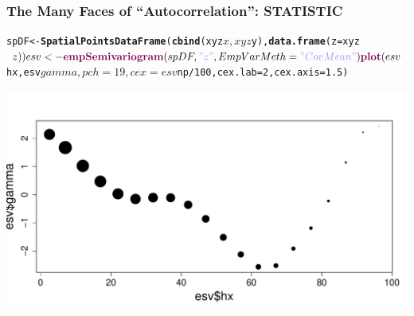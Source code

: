 \documentclass[mathserif,compress]{beamer}\usepackage{graphicx, color}
\makeatletter
\newcommand{\hlfunctioncall}[1]{\textcolor[rgb]{0.501960784313725,0,0.329411764705882}{\textbf{#1}}}%
\newcommand{\hlstring}[1]{\textcolor[rgb]{0.6,0.6,1}{#1}}%
\newenvironment{kframe}{%
 \def\at@end@of@kframe{}%
 \ifinner\ifhmode%
  \def\at@end@of@kframe{\end{minipage}}%
  \begin{minipage}{\columnwidth}%
 \fi\fi%
 \def\FrameCommand##1{\hskip\@totalleftmargin \hskip-\fboxsep
 \colorbox{shadecolor}{##1}\hskip-\fboxsep
     \hskip-\linewidth \hskip-\@totalleftmargin \hskip\columnwidth}%
 \MakeFramed {\advance\hsize-\width
   \@totalleftmargin\z@ \linewidth\hsize
   \@setminipage}}%
 {\par\unskip\endMakeFramed%
 \at@end@of@kframe}
\newenvironment{knitrout}{}{} %
\makeatother
\begin{document}
\begin{frame} [fragile]
\frametitle{The Many Faces of ``Autocorrelation'': STATISTIC}
     
\begin{knitrout}\tiny
{}\color{fgcolor}\begin{kframe}
\begin{alltt}
spDF <- \hlfunctioncall{SpatialPointsDataFrame}(\hlfunctioncall{cbind}(xyz$x, xyz$y), \hlfunctioncall{data.frame}(z = xyz$z))
esv <- \hlfunctioncall{empSemivariogram}(spDF, \hlstring{"z"}, EmpVarMeth = \hlstring{"CovMean"})
\hlfunctioncall{plot}(esv$hx, esv$gamma, pch = 19, cex = esv$np/100, cex.lab = 2, cex.axis = 1.5)
\end{alltt}
\end{kframe}

{\centering \includegraphics[width=.7\linewidth]{figure/AutoCor-StatisticFig} 

}



\end{knitrout}

\end{frame}
\end{document}
